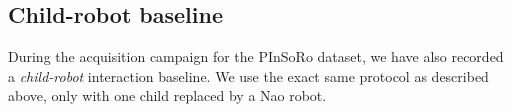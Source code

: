 \documentclass{article}
\begin{document}
%
%
%
%

\subsection{Child-robot baseline}

During the acquisition campaign for the PInSoRo dataset, we have also recorded a
\emph{child-robot} interaction baseline. We use the exact same protocol
as described above, only with one child replaced by a Nao robot.
\end{document}
